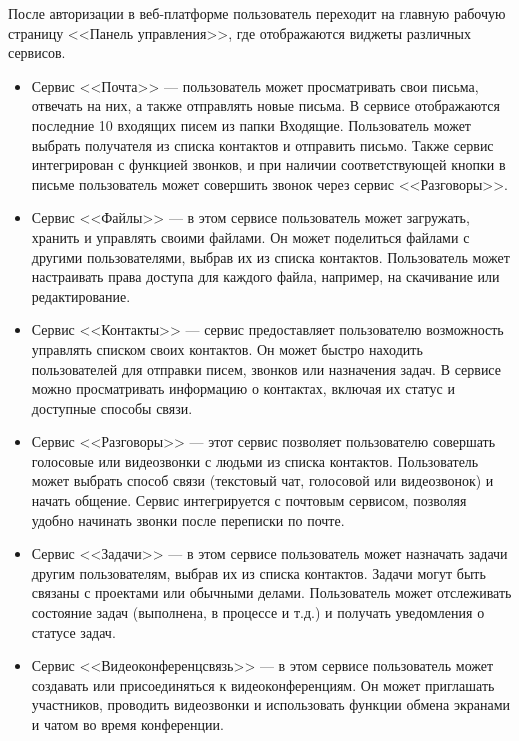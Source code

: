 После авторизации в веб-платформе пользователь переходит на главную рабочую страницу <<Панель управления>>, где отображаются виджеты различных сервисов.

\begin{itemize}
    \item Сервис <<Почта>> — пользователь может просматривать свои письма, отвечать на них, а также отправлять новые письма. В сервисе отображаются последние 10 входящих писем из папки Входящие. Пользователь может выбрать получателя из списка контактов и отправить письмо. Также сервис интегрирован с функцией звонков, и при наличии соответствующей кнопки в письме пользователь может совершить звонок через сервис <<Разговоры>>.
    
    \item Сервис <<Файлы>> — в этом сервисе пользователь может загружать, хранить и управлять своими файлами. Он может поделиться файлами с другими пользователями, выбрав их из списка контактов. Пользователь может настраивать права доступа для каждого файла, например, на скачивание или редактирование.

    \item Сервис <<Контакты>> — сервис предоставляет пользователю возможность управлять списком своих контактов. Он может быстро находить пользователей для отправки писем, звонков или назначения задач. В сервисе можно просматривать информацию о контактах, включая их статус и доступные способы связи.

    \item Сервис <<Разговоры>> — этот сервис позволяет пользователю совершать голосовые или видеозвонки с людьми из списка контактов. Пользователь может выбрать способ связи (текстовый чат, голосовой или видеозвонок) и начать общение. Сервис интегрируется с почтовым сервисом, позволяя удобно начинать звонки после переписки по почте.

    \item Сервис <<Задачи>> — в этом сервисе пользователь может назначать задачи другим пользователям, выбрав их из списка контактов. Задачи могут быть связаны с проектами или обычными делами. Пользователь может отслеживать состояние задач (выполнена, в процессе и т.д.) и получать уведомления о статусе задач.

    \item Сервис <<Видеоконференцсвязь>> — в этом сервисе пользователь может создавать или присоединяться к видеоконференциям. Он может приглашать участников, проводить видеозвонки и использовать функции обмена экранами и чатом во время конференции.


\end{itemize}
